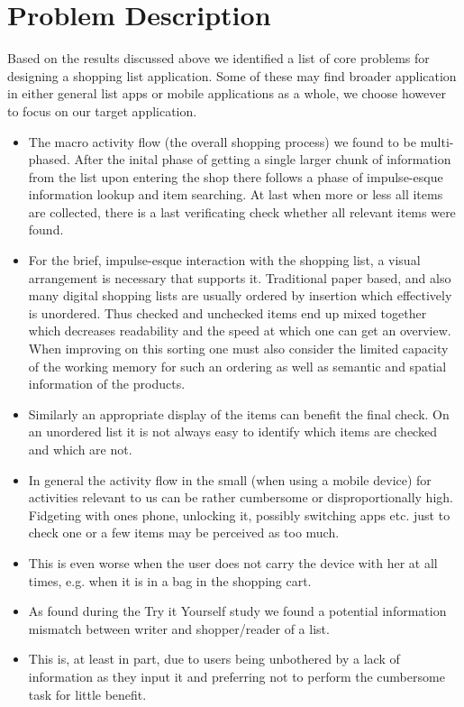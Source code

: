 \documentclass{scrartcl}
\begin{document}
\section{Problem Description}
\label{sec:problem}
Based on the results discussed above we identified a list of core problems for designing a shopping list application.
Some of these may find broader application in either general list apps or mobile applications as a whole, we choose however to focus on our target application.

\begin{itemize}
  \item The macro activity flow (the overall shopping process) we found to be multi-phased. 
    After the inital phase of getting a single larger chunk of information from the list upon entering the shop there follows a phase of impulse-esque information lookup and item searching.
    At last when more or less all items are collected, there is a last verificating check whether all relevant items were found.
  \item For the brief, impulse-esque interaction with the shopping list, a visual arrangement is necessary that supports it. 
    Traditional paper based, and also many digital shopping lists are usually ordered by insertion which effectively is unordered. 
    Thus checked and unchecked items end up mixed together which decreases readability and the speed at which one can get an overview.
    When improving on this sorting one must also consider the limited capacity of the working memory for such an ordering as well as semantic and spatial information of the products.
  \item Similarly an appropriate display of the items can benefit the final check. 
    On an unordered list it is not always easy to identify which items are checked and which are not.

  \item In general the activity flow in the small (when using a mobile device) for activities relevant to us can be rather cumbersome or disproportionally high.
    Fidgeting with ones phone, unlocking it, possibly switching apps etc. just to check one or a few items may be perceived as too much.
  \item This is even worse when the user does not carry the device with her at all times, e.g. when it is in a bag in the shopping cart. 

  \item As found during the Try it Yourself study we found a potential information mismatch between writer and shopper/reader of a list. 
  \item This is, at least in part, due to users being unbothered by a lack of information as they input it and preferring not to perform the cumbersome task for little benefit.
\end{itemize}
\end{document}
